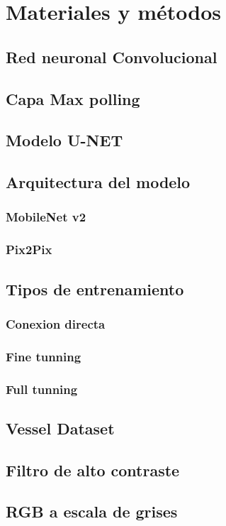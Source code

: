 \section{Materiales y métodos}

\subsection{Red neuronal Convolucional}

\subsection{Capa Max polling}

\subsection{Modelo U-NET}

\subsection{Arquitectura del modelo}

\subsubsection{MobileNet v2}

\subsubsection{Pix2Pix}

\subsection{Tipos de entrenamiento}

\subsubsection{Conexion directa}

\subsubsection{Fine tunning}

\subsubsection{Full tunning}

\subsection{Vessel Dataset}

\subsection{Filtro de alto contraste}

\subsection{RGB a escala de grises}